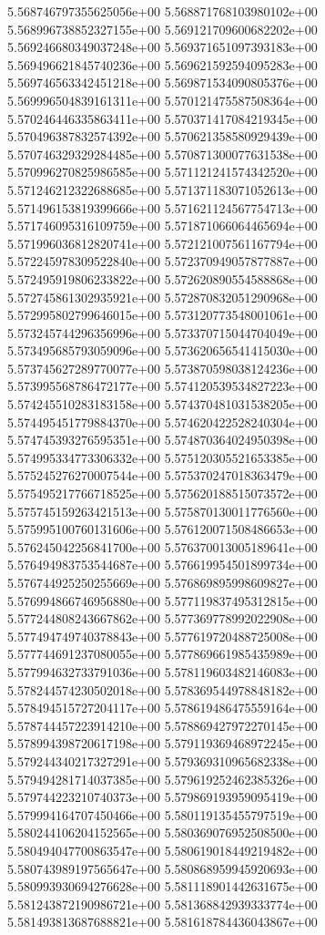 5.568746797355625056e+00
5.568871768103980102e+00
5.568996738852327155e+00
5.569121709600682202e+00
5.569246680349037248e+00
5.569371651097393183e+00
5.569496621845740236e+00
5.569621592594095283e+00
5.569746563342451218e+00
5.569871534090805376e+00
5.569996504839161311e+00
5.570121475587508364e+00
5.570246446335863411e+00
5.570371417084219345e+00
5.570496387832574392e+00
5.570621358580929439e+00
5.570746329329284485e+00
5.570871300077631538e+00
5.570996270825986585e+00
5.571121241574342520e+00
5.571246212322688685e+00
5.571371183071052613e+00
5.571496153819399666e+00
5.571621124567754713e+00
5.571746095316109759e+00
5.571871066064465694e+00
5.571996036812820741e+00
5.572121007561167794e+00
5.572245978309522840e+00
5.572370949057877887e+00
5.572495919806233822e+00
5.572620890554588868e+00
5.572745861302935921e+00
5.572870832051290968e+00
5.572995802799646015e+00
5.573120773548001061e+00
5.573245744296356996e+00
5.573370715044704049e+00
5.573495685793059096e+00
5.573620656541415030e+00
5.573745627289770077e+00
5.573870598038124236e+00
5.573995568786472177e+00
5.574120539534827223e+00
5.574245510283183158e+00
5.574370481031538205e+00
5.574495451779884370e+00
5.574620422528240304e+00
5.574745393276595351e+00
5.574870364024950398e+00
5.574995334773306332e+00
5.575120305521653385e+00
5.575245276270007544e+00
5.575370247018363479e+00
5.575495217766718525e+00
5.575620188515073572e+00
5.575745159263421513e+00
5.575870130011776560e+00
5.575995100760131606e+00
5.576120071508486653e+00
5.576245042256841700e+00
5.576370013005189641e+00
5.576494983753544687e+00
5.576619954501899734e+00
5.576744925250255669e+00
5.576869895998609827e+00
5.576994866746956880e+00
5.577119837495312815e+00
5.577244808243667862e+00
5.577369778992022908e+00
5.577494749740378843e+00
5.577619720488725008e+00
5.577744691237080055e+00
5.577869661985435989e+00
5.577994632733791036e+00
5.578119603482146083e+00
5.578244574230502018e+00
5.578369544978848182e+00
5.578494515727204117e+00
5.578619486475559164e+00
5.578744457223914210e+00
5.578869427972270145e+00
5.578994398720617198e+00
5.579119369468972245e+00
5.579244340217327291e+00
5.579369310965682338e+00
5.579494281714037385e+00
5.579619252462385326e+00
5.579744223210740373e+00
5.579869193959095419e+00
5.579994164707450466e+00
5.580119135455797519e+00
5.580244106204152565e+00
5.580369076952508500e+00
5.580494047700863547e+00
5.580619018449219482e+00
5.580743989197565647e+00
5.580868959945920693e+00
5.580993930694276628e+00
5.581118901442631675e+00
5.581243872190986721e+00
5.581368842939333774e+00
5.581493813687688821e+00
5.581618784436043867e+00
